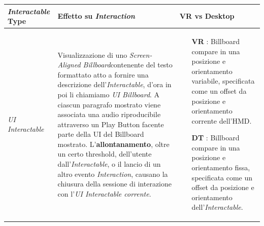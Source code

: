 \documentclass[10pt, openany]{article}
\begin{document}
    \begin{landscape}
    \begin{table}[h!]
      \centering
      \begin{tabular}{@{} p{0.15\paperheight} p{0.3\paperheight} p{0.25\paperheight} @{}}
        \toprule
        \textbf{\textit{Interactable} Type} & \textbf{Effetto su \textit{Interaction}} & \textbf{VR vs Desktop} \\
        \midrule
        \textit{UI Interactable} & 
        Visualizzazione di uno \textit{Screen-Aligned Billboard}\footnotemark[3] contenente del testo formattato 
        atto a fornire una descrizione dell'\textit{Interactable}, d'ora in poi li chiamiamo \textit{UI Billboard}. A ciascun paragrafo mostrato 
        viene associata una audio riproducibile attraverso un Play Button facente parte della UI del Billboard mostrato. L'\textbf{allontanamento}, oltre un certo 
        threshold, dell'utente dall'\textit{Interactable}, o il lancio di un altro evento \textit{Interaction}, causano la chiusura della sessione di 
        interazione con l'\textit{UI Interactable corrente}.
        & \begin{itemize}[topsep=0pt, noitemsep]
          \item[\textbf{VR}]: Billboard compare in una posizione e orientamento variabile, specificata come un offset da posizione e orientamento corrente dell'HMD.
          \item[\textbf{DT}]: Billboard compare in una posizione e orientamento fissa, specificata come un offset da posizione e orientamento dell'\textit{Interactable}.
        \end{itemize} \\
        

\end{tabular}
\end{table}
\end{landscape}
\end{document}
